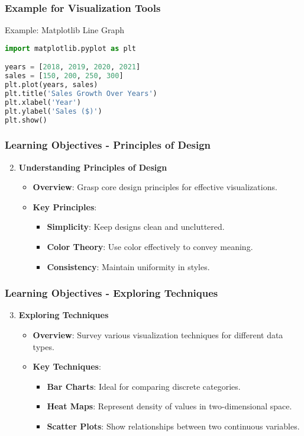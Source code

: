 \documentclass[aspectratio=169]{beamer}
\begin{document}
\begin{frame}[fragile]
    \frametitle{Example for Visualization Tools}
    \begin{block}{Example: Matplotlib Line Graph}
        \begin{lstlisting}[language=Python]
import matplotlib.pyplot as plt

years = [2018, 2019, 2020, 2021]
sales = [150, 200, 250, 300]
plt.plot(years, sales)
plt.title('Sales Growth Over Years')
plt.xlabel('Year')
plt.ylabel('Sales ($)')
plt.show()
        \end{lstlisting}
    \end{block}
\end{frame}

\begin{frame}
    \frametitle{Learning Objectives - Principles of Design}
    \begin{enumerate}
        \setcounter{enumi}{1}
        \item \textbf{Understanding Principles of Design}
        \begin{itemize}
            \item \textbf{Overview}: Grasp core design principles for effective visualizations.
            \item \textbf{Key Principles}:
            \begin{itemize}
                \item \textbf{Simplicity}: Keep designs clean and uncluttered.
                \item \textbf{Color Theory}: Use color effectively to convey meaning.
                \item \textbf{Consistency}: Maintain uniformity in styles.
            \end{itemize}
        \end{itemize}
    \end{enumerate}
\end{frame}

\begin{frame}
    \frametitle{Learning Objectives - Exploring Techniques}
    \begin{enumerate}
        \setcounter{enumi}{2}
        \item \textbf{Exploring Techniques}
        \begin{itemize}
            \item \textbf{Overview}: Survey various visualization techniques for different data types.
            \item \textbf{Key Techniques}:
            \begin{itemize}
                \item \textbf{Bar Charts}: Ideal for comparing discrete categories.
                \item \textbf{Heat Maps}: Represent density of values in two-dimensional space.
                \item \textbf{Scatter Plots}: Show relationships between two continuous variables.
            \end{itemize}
        \end{itemize}
    \end{enumerate}
\end{frame}
\end{document}
